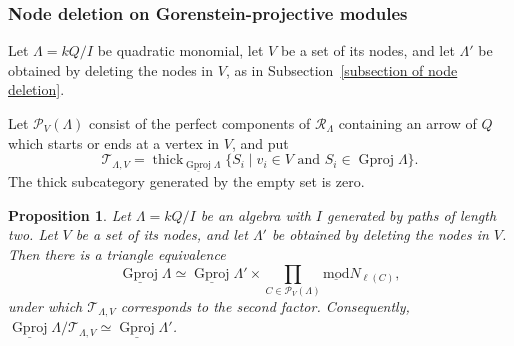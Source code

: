 \documentclass[11pt]{article}
\newcommand{\smod}{\operatorname{\underline{mod}}}
\providecommand{\varLambda}{\Lambda}
\newtheorem{proposition}[theorem]{Proposition}
\theoremstyle{definition}
\begin{document}
		\subsubsection{Node deletion on Gorenstein-projective modules}

			Let $\varLambda=kQ/I$ be quadratic monomial, let $V$ be a set of its nodes, and let $\varLambda'$ be obtained by deleting the nodes in $V$, as in Subsection~\ref{subsection of node deletion}.

			Let $\mathcal P_V(\varLambda)$ consist of the perfect components of $\mathcal R_{\varLambda}$ containing an arrow of $Q$ which starts or ends at a vertex in $V$, and put
			\[
				\mathcal T_{\varLambda,V}	=
				\operatorname{thick}_{\underline{\operatorname{Gproj}}\varLambda}
				\{S_i\mid v_i\in V\text{ and }
				S_i\in\operatorname{Gproj}\varLambda\}.
			\]
			The thick subcategory generated by the empty set is zero.

			\begin{proposition}
				\label{proposition of node deletion Gorenstein projectives}
				Let $\varLambda=kQ/I$ be an algebra with $I$ generated by paths of length two. Let $V$ be a set of its nodes, and let $\varLambda'$ be obtained by deleting the nodes in $V$. 	Then there is a triangle equivalence
				\[
					\underline{\operatorname{Gproj}}\varLambda
					\simeq
					\underline{\operatorname{Gproj}}\varLambda'
					\times
					\prod_{C\in\mathcal P_V(\varLambda)}
					\smod N_{\ell(C)},
				\]
				under which $\mathcal T_{\varLambda,V}$ corresponds to the second factor.
				Consequently, $\underline{\operatorname{Gproj}}\varLambda/
				\mathcal T_{\varLambda,V}
				\simeq \underline{\operatorname{Gproj}}\varLambda'$.
			\end{proposition}
\end{document}
